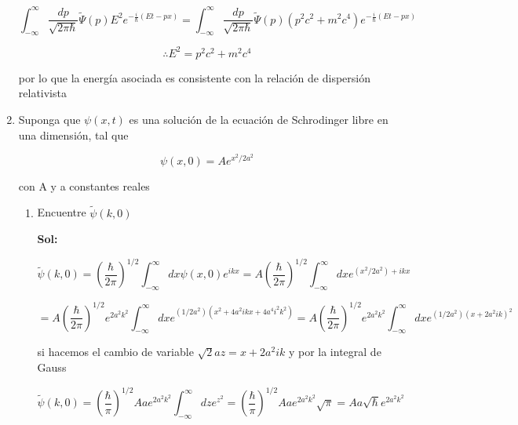 \documentclass[12pt,a4paper]{article}
\begin{document}
\begin{enumerate}
    \begin{equation*}
        \int_{-\infty}^{\infty} \frac{dp}{\sqrt{2 \pi \hbar}} \tilde{\Psi}(p) E^2 e^{-\frac{i}{\hbar}(Et-px)} = \int_{-\infty}^{\infty} \frac{dp}{\sqrt{2 \pi \hbar}} \tilde{\Psi}(p)(p^2c^2+m^2 c^4) e^{-\frac{i}{\hbar}(Et-px)} 
    \end{equation*}
    
    \begin{equation*}
        \therefore E^2 = p^2c^2  + m^2 c^4
    \end{equation*}
    
    por lo que la energía asociada es consistente con la relación de dispersión relativista
    
    
    
    


    
    \item Suponga que $ \psi (x,t)$ es una solución de la ecuación de Schrodinger libre en una dimensión, tal que
    
    \begin{equation*}
        \psi(x,0) = A e^{x^2/2a^2}
    \end{equation*}
    
    con A y a constantes reales
    
    \begin{enumerate}
        \item  Encuentre $\tilde{\psi}(k,0)$
        
        \textbf{Sol:}
        
        \begin{equation*}
            \tilde{\psi}(k,0) = \left(\frac{\hbar}{2\pi}\right)^{1/2} \int_{-\infty}^{\infty} dx \psi (x,0) e^{ikx} =A\left(\frac{\hbar}{2\pi}\right)^{1/2} \int_{-\infty}^{\infty} dx  e^{(x^2/2a^2) + ikx} 
        \end{equation*}
        
        \begin{equation*}
            = A\left(\frac{\hbar}{2\pi}\right)^{1/2} e^{2a^2k^2} \int_{-\infty}^{\infty} dx e^{(1/2a^2)(x^2+ 4a^2ikx+ 4a^4i^2k^2)} = A\left(\frac{\hbar}{2\pi}\right)^{1/2} e^{2a^2k^2} \int_{-\infty}^{\infty} dx e^{(1/2a^2)(x + 2a^2ik)^2}
        \end{equation*}
        
        si hacemos el cambio de variable $\sqrt{2}az =x+ 2a^2ik $ y por la integral de Gauss 
        
        \begin{equation*}
            \tilde{\psi}(k,0) = \left(\frac{\hbar}{\pi}\right)^{{1/2}} Aae^{2a^2k^2} \int_{-\infty}^{\infty} dz e^{z^2}= \left(\frac{\hbar}{\pi}\right)^{1/2} Aae^{2a^2k^2} \sqrt{\pi} =Aa\sqrt{\hbar}e^{2a^2k^2} 
        \end{equation*}
        

\end{enumerate}
\end{enumerate}
\end{document}
